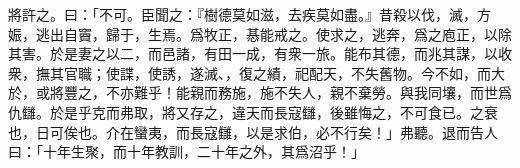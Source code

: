 將許之。曰：「不可。臣聞之：『樹德莫如滋，去疾莫如盡。』昔殺以伐，滅，方娠，逃出自竇，歸于，生焉。爲牧正，惎能戒之。使求之，逃奔，爲之庖正，以除其害。於是妻之以二，而邑諸，有田一成，有衆一旅。能布其德，而兆其謀，以收衆，撫其官職；使諜，使誘，遂滅、，復之績，祀配天，不失舊物。今不如，而大於，或將豐之，不亦難乎！能親而務施，施不失人，親不棄勞。與我同壤，而世爲仇讎。於是乎克而弗取，將又存之，違天而長寇讎，後雖悔之，不可食已。之衰也，日可俟也。介在蠻夷，而長寇讎，以是求伯，必不行矣！」弗聽。退而告人曰：「十年生聚，而十年教訓，二十年之外，其爲沼乎！」

